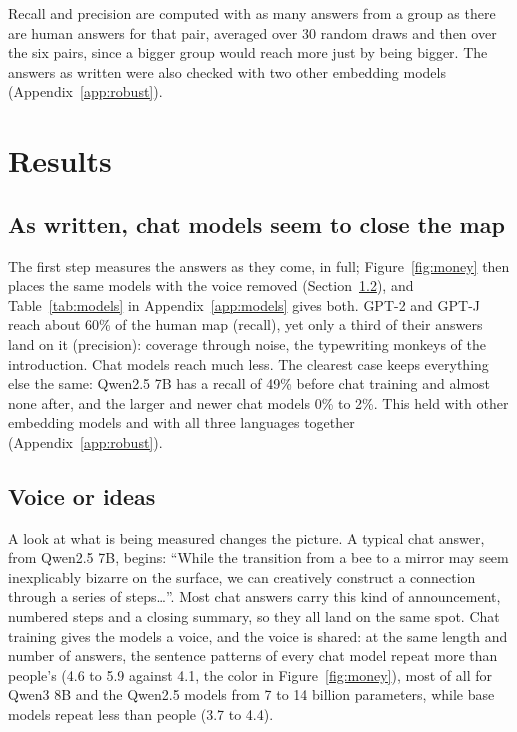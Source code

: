 \documentclass[11pt]{article}
\begin{document}
Recall and precision are computed with as many answers from a group as there are human answers for that pair, averaged over 30 random draws and then over the six pairs, since a bigger group would reach more just by being bigger. The answers as written were also checked with two other embedding models (Appendix~\ref{app:robust}).

\section{Results}
\label{sec:results}

\subsection{As written, chat models seem to close the map}

The first step measures the answers as they come, in full; Figure~\ref{fig:money} then places the same models with the voice removed (Section~\ref{sec:voiceideas}), and Table~\ref{tab:models} in Appendix~\ref{app:models} gives both. GPT-2 and GPT-J reach about 60\% of the human map (recall), yet only a third of their answers land on it (precision): coverage through noise, the typewriting monkeys of the introduction. Chat models reach much less. The clearest case keeps everything else the same: Qwen2.5 7B has a recall of 49\% before chat training and almost none after, and the larger and newer chat models 0\% to 2\%. This held with other embedding models and with all three languages together (Appendix~\ref{app:robust}).

\subsection{Voice or ideas}
\label{sec:voiceideas}

A look at what is being measured changes the picture. A typical chat answer, from Qwen2.5 7B, begins: ``While the transition from a bee to a mirror may seem inexplicably bizarre on the surface, we can creatively construct a connection through a series of steps\ldots''. Most chat answers carry this kind of announcement, numbered steps and a closing summary, so they all land on the same spot. Chat training gives the models a voice, and the voice is shared: at the same length and number of answers, the sentence patterns of every chat model repeat more than people's (4.6 to 5.9 against 4.1, the color in Figure~\ref{fig:money}), most of all for Qwen3 8B and the Qwen2.5 models from 7 to 14 billion parameters, while base models repeat less than people (3.7 to 4.4).
\end{document}
